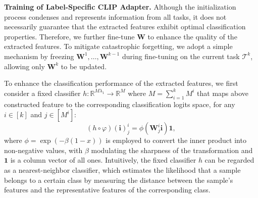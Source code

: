 \documentclass{article}
\theoremstyle{plain}
\theoremstyle{definition}
\theoremstyle{remark}
\begin{document}
\textbf{Training of Label-Specific CLIP Adapter.} 
Although the initialization process condenses and represents information from all tasks, it does not necessarily guarantee that the extracted features exhibit optimal classification properties.
Therefore, we further fine-tune $\boldsymbol{W}$ to enhance the quality of the extracted features. To mitigate catastrophic forgetting, we adopt a simple mechanism by freezing $\boldsymbol{W}^{1}, \dots, \boldsymbol{W}^{k-1}$ during fine-tuning on the current task $\mathcal{T}^{k}$, allowing only $\boldsymbol{W}^{k}$ to be updated.

To enhance the classification performance of the extracted features, we first consider a fixed classifier $h : \mathbb{R}^{M \lambda_1} \to \mathbb{R}^{M}$ where $M = \sum_{i=1}^{k} M^{i}$ that maps above constructed feature to the corresponding classification logits space, for any $i \in [k]$ and $j \in [M^{i}]$:
\begin{equation}
\left(h \circ \varphi\right)(\boldsymbol{i})_{j}^{i} =  \phi ( \boldsymbol{W}_{j}^{i} \boldsymbol{i}) \boldsymbol{1},
\end{equation}
where $\phi = \exp(-\beta(1-x))$ is employed to convert the inner product into non-negative values, with $\beta$ modulating the sharpness of the transformation and $\boldsymbol{1}$ is a column vector of all ones. Intuitively, the fixed classifier $h$ can be regarded as a nearest-neighbor classifier, which estimates the likelihood that a sample belongs to a certain class by measuring the distance between the sample's features and the representative features of the corresponding class.
\end{document}
